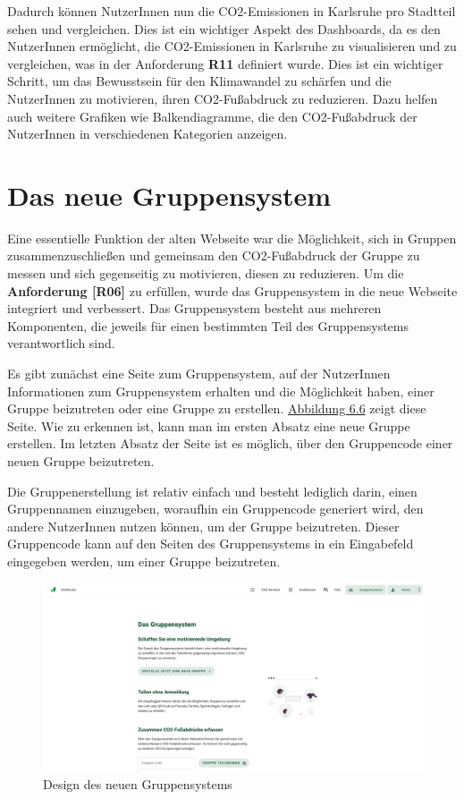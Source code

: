 Dadurch können NutzerInnen nun die CO2-Emissionen in Karlsruhe pro Stadtteil sehen und vergleichen. Dies ist ein wichtiger Aspekt des Dashboards, da es den NutzerInnen ermöglicht, die CO2-Emissionen in Karlsruhe zu visualisieren und zu vergleichen, was in der Anforderung \textbf{R11} definiert wurde. Dies ist ein wichtiger Schritt, um das Bewusstsein für den Klimawandel zu schärfen und die NutzerInnen zu motivieren, ihren CO2-Fußabdruck zu reduzieren. Dazu helfen auch weitere Grafiken wie Balkendiagramme, die den CO2-Fußabdruck der NutzerInnen in verschiedenen Kategorien anzeigen.

\section{Das neue Gruppensystem}

Eine essentielle Funktion der alten Webseite war die Möglichkeit, sich in Gruppen zusammenzuschließen und gemeinsam den CO2-Fußabdruck der Gruppe zu messen und sich gegenseitig zu motivieren, diesen zu reduzieren. Um die \textbf{Anforderung [R06]} zu erfüllen, wurde das Gruppensystem in die neue Webseite integriert und verbessert. Das Gruppensystem besteht aus mehreren Komponenten, die jeweils für einen bestimmten Teil des Gruppensystems verantwortlich sind.

Es gibt zunächst eine Seite zum Gruppensystem, auf der NutzerInnen Informationen zum Gruppensystem erhalten und die Möglichkeit haben, einer Gruppe beizutreten oder eine Gruppe zu erstellen. \hyperref[fig:gruppensystem-neues-design]{Abbildung 6.6} zeigt diese Seite. Wie zu erkennen ist, kann man im ersten Absatz eine neue Gruppe erstellen. Im letzten Absatz der Seite ist es möglich, über den Gruppencode einer neuen Gruppe beizutreten.

Die Gruppenerstellung ist relativ einfach und besteht lediglich darin, einen Gruppennamen einzugeben, woraufhin ein Gruppencode generiert wird, den andere NutzerInnen nutzen können, um der Gruppe beizutreten. Dieser Gruppencode kann auf den Seiten des Gruppensystems in ein Eingabefeld eingegeben werden, um einer Gruppe beizutreten.

\begin{figure}[H]
    \centering
    \includegraphics[width=1\textwidth]{images/06/gruppensystem-design.png}
    \caption{Design des neuen Gruppensystems}
    \label{fig:gruppensystem-neues-design}
\end{figure}

